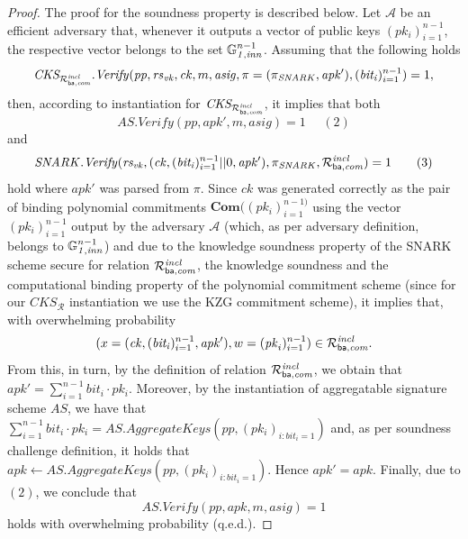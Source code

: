 \begin{proof}
\noindent The proof for the soundness property is described below. Let $\mathcal{A}$ be an efficient adversary that, 
whenever it outputs a vector of public keys $(\mathit{pk_i})_{i=1}^{n-1}$, the respective vector belongs to the set $\mathbb{G}_{\mathit{1,inn}}^{n-1}$. 
Assuming that the following holds 
$$\mathit{CKS_{\mathcal{R}^{\mathit{incl}}_{\mathsf{ba},\mathit{com}}}.Verify}(\mathit{pp}, \mathit{rs}_{\mathit{vk}}, \mathit{ck}, m, \mathit{asig}, \pi = (\pi_{\mathit{SNARK}}, \mathit{apk'}), (\mathit{bit_i})_{i=1}^{n-1}) =1,$$ 
then, according to instantiation for $\mathit{CKS_{\mathcal{R}^{\mathit{incl}}_{\mathsf{ba},\mathit{com}}}}$, it implies that both 
$$\mathit{AS.Verify(\mathit{pp}, \mathit{apk'}, m, \mathit{asig})} = 1 \ \ \ \ \ \ (2)$$ 
and 
$$\mathit{SNARK.Verify}(\mathit{rs_{vk}}, (\mathit{ck}, (\mathit{bit_i})_{i=1}^{n-1}||0, \mathit{apk'}), \pi_{\mathit{SNARK}}, \mathcal{R}^{\mathit{incl}}_{\mathsf{ba},\mathit{com}}) = 1  \ \ \ \ \ \ (3)$$
hold where $\mathit{apk'}$ was parsed from $\pi$. Since $\mathit{ck}$ was generated correctly as the pair of binding polynomial commitments 
$\mathbf{Com}((\mathit{pk_i})_{i=1}^{n-1)}$ using the vector $(\mathit{pk_i})_{i=1}^{n-1}$ output by the adversary $\mathcal{A}$ 
(which, as per adversary definition, belongs to $\mathbb{G}_{\mathit{1,inn}}^{n-1}$) and due to the knowledge 
soundness property of the SNARK scheme secure for relation $\mathcal{R}^{\mathit{incl}}_{\mathsf{ba},\mathit{com}}$, the knowledge soundness and the computational binding property 
of the polynomial commitment scheme (since for our $\mathit{CKS_{\mathcal{R}}}$ instantiation we use the KZG commitment scheme), it implies that, 
with overwhelming probability $$(x = (\mathit{ck}, (\mathit{bit_i})_{i=1}^{n-1}, \mathit{apk'}), w = (\mathit{pk}_i)_{i=1}^{n-1}) \in \mathcal{R}^{\mathit{incl}}_{\mathsf{ba},\mathit{com}}.$$ 
From this, in turn, by the definition of relation $\mathcal{R}^{\mathit{incl}}_{\mathsf{ba},\mathit{com}}$, we obtain that 
$\mathit{apk'} = \sum_{i=1}^{n-1} \mathit{bit_i} \cdot \mathit{pk_i}$. Moreover, by the instantiation of aggregatable signature scheme 
$\mathit{AS}$, we have that $\sum_{i=1}^{n-1} \mathit{bit_i} \cdot \mathit{pk_i} = \mathit{AS.AggregateKeys}(\mathit{pp}, (\mathit{pk_i})_{i:\mathit{bit_i = 1}})$ 
and, as per soundness challenge definition, it holds that \\
$\mathit{apk} \leftarrow \mathit{AS.AggregateKeys}(\mathit{pp}, (\mathit{pk_i})_{i:\mathit{bit_i = 1}})$. Hence $\mathit{apk'} = \mathit{apk}$.
Finally, due to $(2)$, we conclude that $$\mathit{AS.Verify(\mathit{pp}, \mathit{apk}, m, \mathit{asig})} = 1$$ holds with overwhelming probability (q.e.d.).

\end{proof}